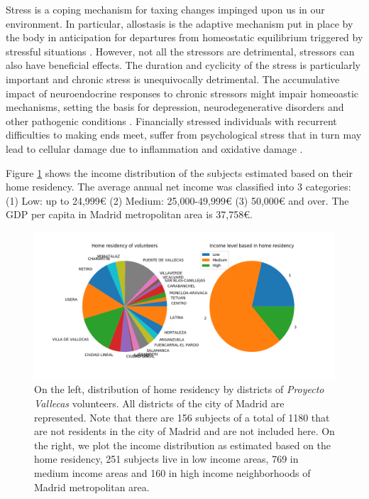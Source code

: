 \documentclass[11pt]{article}
\theoremstyle{definition}
\theoremstyle{remark}
\begin{document}
Stress is a coping mechanism for taxing changes impinged upon us in our environment. In particular, allostasis is the adaptive mechanism put in place by the body in anticipation for departures from homeostatic equilibrium triggered by stressful situations \cite{ellis2014beyond}. However, not all the stressors are detrimental, stressors can also have beneficial effects. 
The duration and cyclicity of the stress is particularly important and chronic stress is unequivocally detrimental. The accumulative impact of neuroendocrine responses to chronic stressors might impair homeoastic mechanisms, setting the basis for depression, neurodegenerative disorders and other pathogenic conditions \cite{bisht2018chronic}. Financially stressed individuals with recurrent difficulties to making ends meet, suffer from psychological stress that in turn may lead to cellular damage due to inflammation and oxidative damage \cite{hayashi2015conversion}. 

Figure \ref{fig:incomeresidency} shows the income distribution of the subjects estimated based on their home residency. The average annual net income was classified into 3 categories: (1) Low: up to 24,999€ (2) Medium: 25,000-49,999€ (3) 50,000€ and over. The GDP per capita in Madrid metropolitan area is 37,758€.


\begin{figure}[H]
        \centering
        \includegraphics[keepaspectratio, width=\linewidth]{figures/incomeresidency}
        \caption{On the left, distribution of home residency by districts of \emph{Proyecto Vallecas} volunteers. All districts of the city of Madrid are represented. Note that there are 156 subjects of a total of 1180 that are not residents in the city of Madrid and are not included here. On the right, we plot the income distribution as estimated based on the home residency, 251 subjects live in low income areas, 769 in medium income areas and 160 in high income neighborhoods of Madrid metropolitan area.
        } \label{fig:incomeresidency}
\end{figure}
\end{document}

